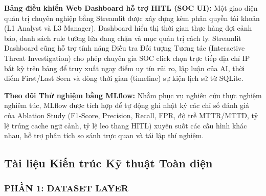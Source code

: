 \documentclass[12pt,a4paper]{article}
\begin{document}
\textbf{Bảng điều khiển Web Dashboard hỗ trợ HITL (SOC UI):} Một giao diện quản trị chuyên nghiệp bằng Streamlit được xây dựng kèm phân quyền tài khoản (L1 Analyst và L3 Manager). Dashboard hiển thị thời gian thực hàng đợi cảnh báo, danh sách rule tường lửa đang chặn và mục quản trị cách ly. Streamlit Dashboard cũng hỗ trợ tính năng Điều tra Đối tượng Tương tác (Interactive Threat Investigation) cho phép chuyên gia SOC click chọn trực tiếp địa chỉ IP bất kỳ trên bảng để truy xuất ngay điểm uy tín rủi ro, lập luận của AI, thời điểm First/Last Seen và dòng thời gian (timeline) sự kiện lịch sử từ SQLite.

\textbf{Theo dõi Thử nghiệm bằng MLflow:} Nhằm phục vụ nghiên cứu thực nghiệm nghiêm túc, MLflow được tích hợp để tự động ghi nhật ký các chỉ số đánh giá của Ablation Study (F1-Score, Precision, Recall, FPR, độ trễ MTTR/MTTD, tỷ lệ trúng cache ngữ cảnh, tỷ lệ leo thang HITL) xuyên suốt các cấu hình khác nhau, hỗ trợ phân tích so sánh trực quan và tái lập thí nghiệm.

\subsection{Tài liệu Kiến trúc Kỹ thuật Toàn diện}

\subsubsection{PHẦN 1: DATASET LAYER}
\end{document}
